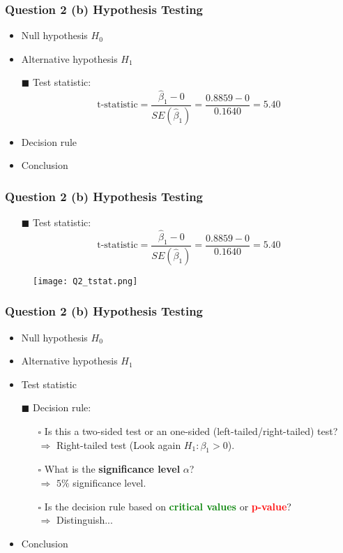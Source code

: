 \documentclass[11pt, xcolor=x11names,compress]{beamer}
\begin{document}
\begin{frame}[fragile,t]
\frametitle{Question 2 (b) Hypothesis Testing} 
\linespread{1.15}
\begin{itemize}
    \item Null hypothesis $H_0$
    \item Alternative hypothesis $H_1$
    \item [$\blacksquare$] Test statistic:
$$
\text{t-statistic}=\frac{\hat{\beta}_{1}-0}{S E\left(\hat{\beta}_{1}\right)}=\frac{0.8859-0}{0.1640}=5.40
$$    \item Decision rule
    \item Conclusion
\end{itemize}
\end{frame}
\begin{frame}[fragile,t]
\frametitle{Question 2 (b) Hypothesis Testing} 
\linespread{1.15}
\begin{itemize}
    \item [$\blacksquare$] Test statistic:
$$
\text{t-statistic}=\frac{\hat{\beta}_{1}-0}{S E\left(\hat{\beta}_{1}\right)}=\frac{0.8859-0}{0.1640}=5.40
$$   
\end{itemize}
\begin{figure}
    \centering
    \texttt{[image: Q2\_tstat.png]}
    \caption{}
\end{figure}
\end{frame}
\begin{frame}[fragile,t]
\frametitle{Question 2 (b) Hypothesis Testing} 
\linespread{1.15}
\begin{itemize}
    \item Null hypothesis $H_0$
    \item Alternative hypothesis $H_1$
    \item Test statistic
    \item [$\blacksquare$] Decision rule:
    \begin{itemize}
        \item [$\square$] Is this a two-sided test or an one-sided (left-tailed/right-tailed) test?\\
        $\Longrightarrow$ Right-tailed test (Look again $H_1: \beta_1 > 0$).
        \item [$\square$] What is the \textbf{significance level} $\alpha$?\\
        $\Longrightarrow$ $5\%$ significance level.
        \item [$\square$] Is the decision rule based on \textcolor{green}{\textbf{critical values}} or \textcolor{red}{\textbf{p-value}}?\\
        $\Longrightarrow$ Distinguish...
    \end{itemize}
    \item Conclusion
\end{itemize}

\end{frame}
\end{document}
